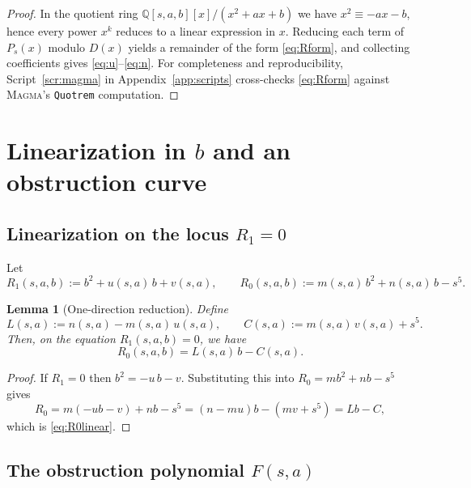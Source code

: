 \documentclass[12pt]{article}
\newtheorem{lemma}{Lemma}
\theoremstyle{remark}
\theoremstyle{definition}
\begin{document}
\begin{proof}
In the quotient ring $\mathbb{Q}[s,a,b][x]/(x^{2}+ax+b)$ we have $x^{2}\equiv-ax-b$, hence every power $x^{k}$ reduces to a linear expression in $x$.
Reducing each term of $P_s(x)$ modulo $D(x)$ yields a remainder of the form \eqref{eq:Rform}, and collecting coefficients gives \eqref{eq:u}--\eqref{eq:n}.
For completeness and reproducibility, Script~\ref{scr:magma} in Appendix~\ref{app:scripts} cross-checks \eqref{eq:Rform} against \textsc{Magma}'s \texttt{Quotrem} computation.
\end{proof}


\section{Linearization in \texorpdfstring{$b$}{b} and an obstruction curve}\label{sec:obstruction}

\subsection{Linearization on the locus \texorpdfstring{$R_1=0$}{R1=0}}

Let
\begin{equation}\label{eq:R1R0}
R_1(s,a,b):=b^{2}+u(s,a)\,b+v(s,a),\qquad
R_0(s,a,b):=m(s,a)\,b^{2}+n(s,a)\,b-s^{5}.
\end{equation}

\begin{lemma}[One-direction reduction]\label{lem:linearize}
Define
\begin{equation}\label{eq:LC}
L(s,a):=n(s,a)-m(s,a)\,u(s,a),\qquad C(s,a):=m(s,a)\,v(s,a)+s^{5}.
\end{equation}
Then, on the equation $R_1(s,a,b)=0$, we have
\begin{equation}\label{eq:R0linear}
R_0(s,a,b)=L(s,a)\,b-C(s,a).
\end{equation}
\end{lemma}

\begin{proof}
If $R_1=0$ then $b^{2}=-u\,b-v$. Substituting this into $R_0=m b^{2}+n b-s^{5}$ gives
\[
R_0=m(-u b-v)+n b-s^{5}=(n-mu)b-(mv+s^{5})=L b-C,
\]
which is \eqref{eq:R0linear}.
\end{proof}

\subsection{The obstruction polynomial \texorpdfstring{$F(s,a)$}{F(s,a)}}
\end{document}
